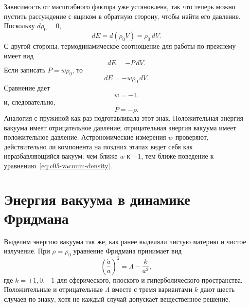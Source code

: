 Зависимость от масштабного фактора уже установлена, так что теперь можно пустить рассуждение с ящиком в обратную сторону, чтобы найти его давление. Поскольку \(d\rho_0=0\),
\begin{equation}
dE=d(\rho_0V)=\rho_0\,dV.
\end{equation}
С другой стороны, термодинамическое соотношение для работы по-прежнему имеет вид
\begin{equation}
dE=-P\,dV.
\end{equation}
Если записать \(P=w\rho_0\), то
\begin{equation}
dE=-w\rho_0\,dV.
\end{equation}
Сравнение дает
\begin{equation}
w=-1.
\end{equation}
и, следовательно,
\begin{equation}
P=-\rho.
\end{equation}
Аналогия с пружиной как раз подготавливала этот знак. Положительная энергия вакуума имеет отрицательное давление; отрицательная энергия вакуума имеет положительное давление. Астрономические измерения \(w\) проверяют, действительно ли компонента на поздних этапах ведет себя как неразбавляющийся вакуум: чем ближе \(w\) к \(-1\), тем ближе поведение к уравнению~\eqref{eq:c05-vacuum-density}.

\begin{classroomqa}
\end{classroomqa}

\section{Энергия вакуума в динамике Фридмана}

Выделим энергию вакуума так же, как ранее выделяли чистую материю и чистое излучение. При \(\rho=\rho_0\) уравнение Фридмана принимает вид
\begin{equation}
\left(\frac{\dot a}{a}\right)^2=\Lambda-\frac{k}{a^2},
\label{eq:c05-vacuum-friedmann}
\end{equation}
где \(k=+1,0,-1\) для сферического, плоского и гиперболического пространства. Положительные и отрицательные \(\Lambda\) вместе с тремя вариантами \(k\) дают шесть случаев по знаку, хотя не каждый случай допускает вещественное решение.

